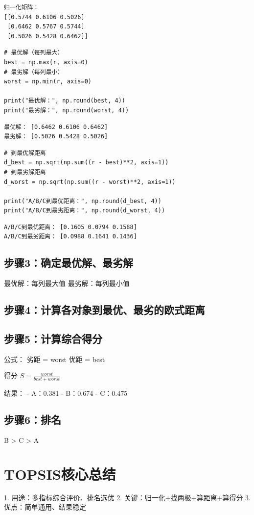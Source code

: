 \documentclass{article}
\begin{document}
\begin{verbatim}
归一化矩阵：
[[0.5744 0.6106 0.5026]
 [0.6462 0.5767 0.5744]
 [0.5026 0.5428 0.6462]]
\end{verbatim}

\begin{lstlisting}
# 最优解（每列最大）
best = np.max(r, axis=0)
# 最劣解（每列最小）
worst = np.min(r, axis=0)

print("最优解：", np.round(best, 4))
print("最劣解：", np.round(worst, 4))
\end{lstlisting}

\begin{verbatim}
最优解： [0.6462 0.6106 0.6462]
最劣解： [0.5026 0.5428 0.5026]
\end{verbatim}

\begin{lstlisting}
# 到最优解距离
d_best = np.sqrt(np.sum((r - best)**2, axis=1))
# 到最劣解距离
d_worst = np.sqrt(np.sum((r - worst)**2, axis=1))

print("A/B/C到最优距离：", np.round(d_best, 4))
print("A/B/C到最劣距离：", np.round(d_worst, 4))
\end{lstlisting}

\begin{verbatim}
A/B/C到最优距离： [0.1605 0.0794 0.1588]
A/B/C到最劣距离： [0.0988 0.1641 0.1436]
\end{verbatim}

\subsection{步骤3：确定最优解、最劣解}
最优解：每列最大值  
最劣解：每列最小值  

\subsection{步骤4：计算各对象到最优、最劣的欧式距离}

\subsection{步骤5：计算综合得分}
公式：  
劣距 = worst
优距 = best

得分 $S = \frac{worst}{best + worst}$

结果：
- A：0.381
- B：0.674
- C：0.475

\subsection{步骤6：排名}
B > C > A

\section{TOPSIS核心总结}
1. 用途：多指标综合评价、排名选优  
2. 关键：归一化+找两极+算距离+算得分  
3. 优点：简单通用、结果稳定  
\end{document}
